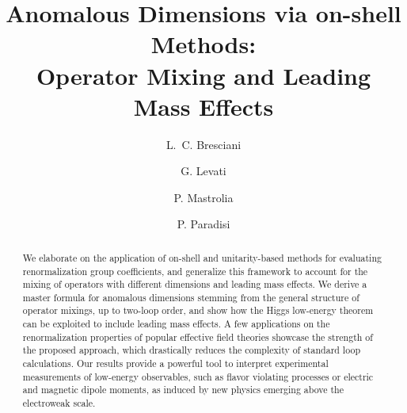 \documentclass[prl,twocolumn,twoside,preprintnumbers,superscriptaddress, nofootinbib]{revtex4-2}
\begin{document}

\title{Anomalous Dimensions 
via on-shell Methods:\\ 
Operator Mixing and Leading Mass Effects
}

\author{L.~C. Bresciani}
\author{G. Levati}
\author{P. Mastrolia}
\author{P. Paradisi}
% 
\begin{abstract}
We elaborate on the application of on-shell and unitarity-based methods for evaluating renormalization group coefficients, and generalize this framework to account for the mixing of operators with different dimensions and leading mass effects. 
We derive a master formula for anomalous dimensions stemming from the general structure of operator mixings, up to two-loop order, and show how the Higgs low-energy theorem can be exploited to include leading mass effects.
A few applications on the renormalization properties of popular effective field theories showcase the strength of 
the proposed approach, which drastically reduces the complexity of standard loop calculations.
Our results provide a powerful tool to interpret experimental measurements of low-energy observables, such as flavor violating processes or electric and magnetic dipole moments, as induced by new physics emerging above the electroweak scale.
\end{abstract}

\maketitle
\end{document}
